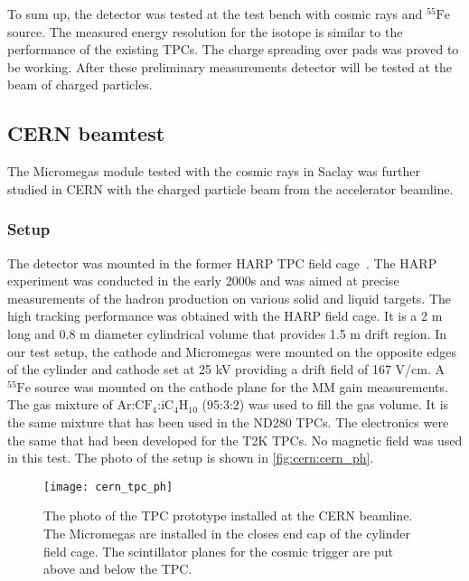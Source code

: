 \documentclass[../main.tex]{subfiles}
\begin{document}
To sum up, the detector was tested at the test bench with cosmic rays and ${}^{55}\text{Fe}$ source. The measured energy resolution for the isotope is similar to the performance of the existing TPCs. The charge spreading over pads was proved to be working. After these preliminary measurements detector will be tested at the beam of charged particles.

\subsection{CERN beamtest}
\label{sec:up:tpc:cern}
The Micromegas module tested with the cosmic rays in Saclay was further studied in CERN with the charged particle beam from the accelerator beamline.

\subsubsection{Setup}
The detector was mounted in the former HARP TPC field cage~\cite{Prior2003}. The HARP experiment was conducted in the early 2000s and was aimed at precise measurements of the hadron production on various solid and liquid targets. The high tracking performance was obtained with the HARP field cage. It is a 2 m long and 0.8 m diameter cylindrical volume that provides 1.5 m drift region. In our test setup, the cathode and Micromegas were mounted on the opposite edges of the cylinder and cathode set at 25 kV providing a drift field of 167 V/cm. A ${}^{55}\text{Fe}$ source was mounted on the cathode plane for the MM gain measurements. The gas mixture of $\text{Ar:CF}_4\text{:iC}_4\text{H}_{10}$ (95:3:2) was used to fill the gas volume. It is the same mixture that has been used in the ND280 TPCs. The electronics were the same that had been developed for the T2K TPCs. No magnetic field was used in this test. The photo of the setup is shown in \autoref{fig:cern:cern_ph}.

\begin{figure}[!ht]
  \centering
  \texttt{[image: cern\_tpc\_ph]}
  \caption{The photo of the TPC prototype installed at the CERN beamline. The Micromegas are installed in the closes end cap of the cylinder field cage. The scintillator planes for the cosmic trigger are put above and below the TPC.}
  \label{fig:cern:cern_ph}
\end{figure}
\end{document}
